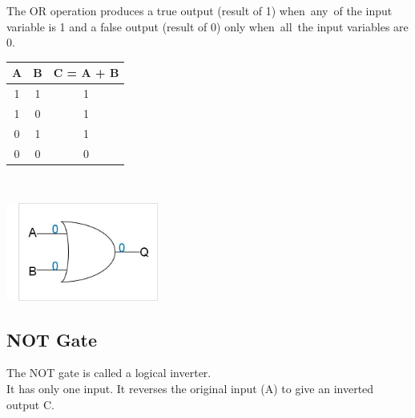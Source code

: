\documentclass[10pt,a4paper,onecolumn]{article}
\begin{document}
The OR operation produces a true output (result of 1) when any of the input variable is 1 and a false output (result of 0) only when all the input variables are 0. \\
\begin{table}[h!]
	\begin{center}
		\begin{tabular}{c|c|c}
			\textbf{A} & \textbf{B} &
			\textbf{C = A + B}\\
			\hline
			1 & 1 & 1\\
			\hline
			1 & 0 & 1\\
			\hline
			0 & 1 & 1\\
			\hline
			0 & 0 & 0\\
			\hline
		\end{tabular}
	\end{center}
\end{table} \\ 
\begin{center}\includegraphics[width=5cm]{gst9} \end{center}

\subsection{NOT Gate}
The NOT gate is called a logical inverter. \\
It has only one input. It reverses the original input (A) to give an inverted output C. \\
\end{document}
